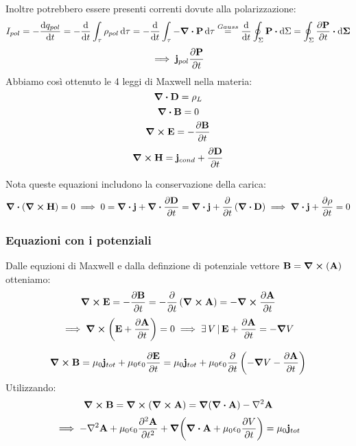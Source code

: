 \documentclass[12pt,a4paper]{article}
\begin{document}
Inoltre potrebbero essere presenti correnti dovute alla polarizzazione:
\begin{equation*}
    I_{pol}= - \dv{q_{pol}}{t} = - \dv{ }{t} \int_\tau \rho_{pol} \dd{\tau}= - \dv{ }{t} \int_\tau-\div{\vb{P}}\dd{\tau}
    \overset{Gauss}{=} \dv{ }{t}\oint_\Sigma \vb{P}\vdot \dd{\Sigma}= \oint_\Sigma \pdv{\vb{P}}{t}\vdot\dd{\vb{\Sigma}}
\end{equation*}
\begin{equation*}
    \implies \vb{j}_{pol} \pdv{\vb{P}}{t} 
\end{equation*}
Abbiamo così ottenuto le 4 leggi di Maxwell nella materia:
\begin{equation*}
    \div{\vb{D}}= \rho_L 
\end{equation*}
\begin{equation*}
    \div{\vb{B}}= 0
\end{equation*}
\begin{equation*}
    \curl{\vb{E}}= -\pdv{\vb{B}}{t}
\end{equation*}
\begin{equation*}
    \curl{\vb{H}}= \vb{j}_{cond}+ \pdv{\vb{D}}{t}
\end{equation*}

Nota queste equazioni includono la conservazione della carica:
\begin{equation*}
    \div(\curl{\vb{H}})=0 \implies 0 = \div{\vb{j}}+ \div{\pdv{\vb{D}}{t}}= \div{\vb{j}}+ \pdv{}{t}\left( \div{\vb{D}} \right)\implies
    \div{\vb{j}}+ \pdv{\rho}{t}=0
\end{equation*}






\subsubsection{Equazioni con i potenziali}
Dalle equzioni di Maxwell e dalla definzione di potenziale vettore $\vb{B}= \curl(\vb{A})$ otteniamo:
\begin{equation*}
    \curl{\vb{E}}= -\pdv{\vb{B}}{t}= -\pdv{}{t}\left( \curl{\vb{A}} \right)= -\curl{\pdv{\vb{A}}{t}}
\end{equation*}
\begin{equation*}
    \implies\curl(\vb{E}+\pdv{\vb{A}}{t})=0\implies \exists\,V  \,|\, \vb{E}+\pdv{\vb{A}}{t}= -\grad{V}
\end{equation*}

\begin{equation*}
    \curl{\vb{B}}= \mu_0\vb{j}_{tot}+ \mu_0\epsilon_0\pdv{\vb{E}}{t}= \mu_0\vb{j}_{tot}+ \mu_0\epsilon_0\pdv{}{t}\left( -\grad{V}-\pdv{\vb{A}}{t} \right)
\end{equation*}
Utilizzando:
\begin{equation*}
    \curl{\vb{B}}= \curl(\curl{\vb{A}}) = \grad(\div{\vb{A}})-\laplacian{\vb{A}}
\end{equation*}
\begin{equation*}
    \implies -\laplacian{\vb{A}}+\mu_0\epsilon_0\pdv[2]{\vb{A}}{t}+\grad(\div{\vb{A}}+\mu_0\epsilon_0\pdv{V}{t})= \mu_0 \vb{j}_{tot}
\end{equation*}
\end{document}
